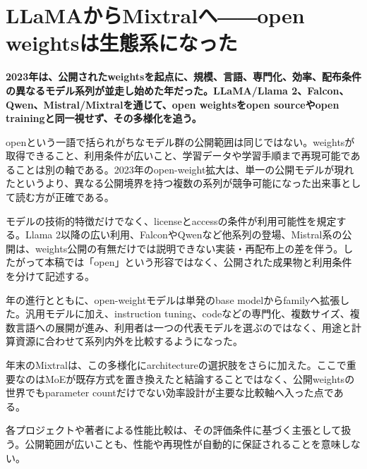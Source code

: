 \section{LLaMAからMixtralへ――open weightsは生態系になった}
\label{pkg:open-weight-ecosystem}
\noindent\textbf{2023年は、公開されたweightsを起点に、規模、言語、専門化、効率、配布条件の異なるモデル系列が並走し始めた年だった。LLaMA/Llama 2、Falcon、Qwen、Mistral/Mixtralを通じて、open weightsをopen sourceやopen trainingと同一視せず、その多様化を追う。}\autocite{src-00c370ab2324,src-1fd43f93adcc,src-240ca564b6b8,src-3db09fede330,src-5c8e2db8871a,src-74aa7e2a7ca4,src-81f670ec1e74,src-8bdb904686fb,src-9df482e2c96c,src-b7e5243e6d59,src-bc7aba201f01,src-d4b6359bbad1,src-dd2cfa98160d,src-f0349196879e}

openという一語で括られがちなモデル群の公開範囲は同じではない。weightsが取得できること、利用条件が広いこと、学習データや学習手順まで再現可能であることは別の軸である。2023年のopen-weight拡大は、単一の公開モデルが現れたというより、異なる公開境界を持つ複数の系列が競争可能になった出来事として読む方が正確である。\autocite{src-00c370ab2324,src-1fd43f93adcc,src-240ca564b6b8,src-3db09fede330,src-5c8e2db8871a,src-74aa7e2a7ca4,src-81f670ec1e74,src-8bdb904686fb,src-9df482e2c96c,src-b7e5243e6d59,src-bc7aba201f01,src-d4b6359bbad1,src-dd2cfa98160d,src-f0349196879e}


モデルの技術的特徴だけでなく、licenseとaccessの条件が利用可能性を規定する。Llama 2以降の広い利用、FalconやQwenなど他系列の登場、Mistral系の公開は、weights公開の有無だけでは説明できない実装・再配布上の差を伴う。したがって本稿では「open」という形容ではなく、公開された成果物と利用条件を分けて記述する。\autocite{src-00c370ab2324,src-1fd43f93adcc,src-240ca564b6b8,src-3db09fede330,src-5c8e2db8871a,src-74aa7e2a7ca4,src-81f670ec1e74,src-8bdb904686fb,src-9df482e2c96c,src-b7e5243e6d59,src-bc7aba201f01,src-d4b6359bbad1,src-dd2cfa98160d,src-f0349196879e}


年の進行とともに、open-weightモデルは単発のbase modelからfamilyへ拡張した。汎用モデルに加え、instruction tuning、codeなどの専門化、複数サイズ、複数言語への展開が進み、利用者は一つの代表モデルを選ぶのではなく、用途と計算資源に合わせて系列内外を比較するようになった。\autocite{src-00c370ab2324,src-240ca564b6b8,src-3db09fede330,src-5c8e2db8871a,src-8bdb904686fb,src-9df482e2c96c,src-b7e5243e6d59,src-bc7aba201f01,src-d4b6359bbad1,src-dd2cfa98160d,src-f0349196879e}


年末のMixtralは、この多様化にarchitectureの選択肢をさらに加えた。ここで重要なのはMoEが既存方式を置き換えたと結論することではなく、公開weightsの世界でもparameter countだけでない効率設計が主要な比較軸へ入った点である。\autocite{src-00c370ab2324,src-dd2cfa98160d,src-f0349196879e}


\begin{claimboundary}
各プロジェクトや著者による性能比較は、その評価条件に基づく主張として扱う。公開範囲が広いことも、性能や再現性が自動的に保証されることを意味しない。\autocite{src-240ca564b6b8,src-3db09fede330,src-8bdb904686fb,src-9df482e2c96c,src-b7e5243e6d59,src-bc7aba201f01}
\end{claimboundary}
